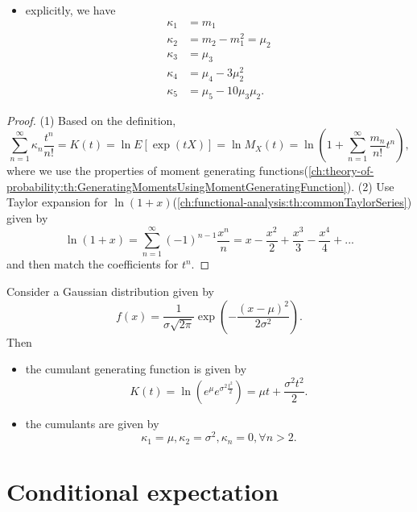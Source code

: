 \begin{refsection}
\begin{lemma}
\begin{itemize}
		\item explicitly, we have
		\begin{align*}
		\kappa_1 &= m_1\\
		\kappa_2 &= m_2 - m_1^2 =\mu_2 \\
		\kappa_3 &= \mu_3 \\
		\kappa_4 &= \mu_4 - 3\mu_2^2 \\
		\kappa_5 &= \mu_5 - 10\mu_3\mu_2. 
		\end{align*} 
	\end{itemize}
\end{lemma}
\begin{proof}
	(1) Based on the definition, 
	$$\sum_{n=1}^{\infty} \kappa_n \frac{t^n}{n!} = K(t) = \ln E[\exp(tX)] = \ln M_X(t) = \ln(1 + \sum_{n=1}^{\infty} \frac{m_n}{n!}t^n),$$
	where we use the properties of moment generating functions(\autoref{ch:theory-of-probability:th:GeneratingMomentsUsingMomentGeneratingFunction}).	
	(2)
	Use Taylor expansion for $\ln (1 + x)$(\autoref{ch:functional-analysis:th:commonTaylorSeries}) given by
	$$\ln (1 + x) =\sum_{n=1}^\infty (-1)^{n-1} \frac{x^{n}}{n} = x - \frac{x^2}{2} + \frac{x^3}{3} - \frac{x^4}{4} + ... $$
	and then match the coefficients for $t^n$.	
\end{proof}

\begin{example}
	Consider a Gaussian distribution given by
	$$f(x) = \frac{1}{\sigma\sqrt{2\pi}}\exp(-\frac{(x-\mu)^2}{2\sigma^2}).$$
	Then
	\begin{itemize}
		\item the cumulant generating function is given by
		$$K(t) = \ln (e^{\mu}e^{\sigma^2\frac{t^2}{2}}) = \mu t + \frac{\sigma^2 t^2}{2}.$$
		\item the cumulants are given by
		$$\kappa_1 = \mu, \kappa_2 = \sigma^2, \kappa_n = 0, \forall n > 2.$$
	\end{itemize}	
\end{example}



\section{Conditional expectation}

\end{refsection}
